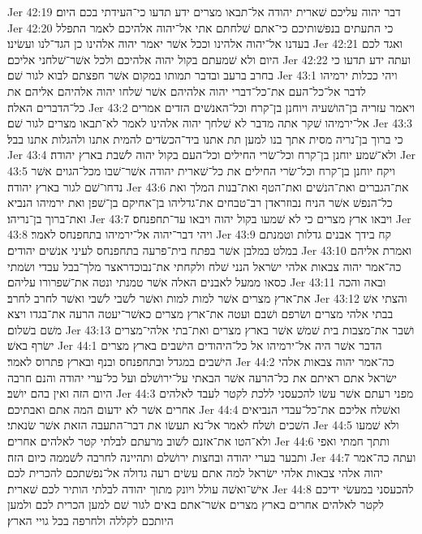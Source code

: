 Jer 42:19  דבר יהוה עליכם שׁארית יהודה אל־תבאו מצרים ידע תדעו כי־העידתי בכם היום׃
Jer 42:20  כי התעתים בנפשׁותיכם כי־אתם שׁלחתם אתי אל־יהוה אלהיכם לאמר התפלל בעדנו אל־יהוה אלהינו וככל אשׁר יאמר יהוה אלהינו כן הגד־לנו ועשׂינו׃
Jer 42:21  ואגד לכם היום ולא שׁמעתם בקול יהוה אלהיכם ולכל אשׁר־שׁלחני אליכם׃
Jer 42:22  ועתה ידע תדעו כי בחרב ברעב ובדבר תמותו במקום אשׁר חפצתם לבוא לגור שׁם׃
Jer 43:1  ויהי ככלות ירמיהו לדבר אל־כל־העם את־כל־דברי יהוה אלהיהם אשׁר שׁלחו יהוה אלהיהם אליהם את כל־הדברים האלה׃
Jer 43:2  ויאמר עזריה בן־הושׁעיה ויוחנן בן־קרח וכל־האנשׁים הזדים אמרים אל־ירמיהו שׁקר אתה מדבר לא שׁלחך יהוה אלהינו לאמר לא־תבאו מצרים לגור שׁם׃
Jer 43:3  כי ברוך בן־נריה מסית אתך בנו למען תת אתנו ביד־הכשׂדים להמית אתנו ולהגלות אתנו בבל׃
Jer 43:4  ולא־שׁמע יוחנן בן־קרח וכל־שׂרי החילים וכל־העם בקול יהוה לשׁבת בארץ יהודה׃
Jer 43:5  ויקח יוחנן בן־קרח וכל־שׂרי החילים את כל־שׁארית יהודה אשׁר־שׁבו מכל־הגוים אשׁר נדחו־שׁם לגור בארץ יהודה׃
Jer 43:6  את־הגברים ואת־הנשׁים ואת־הטף ואת־בנות המלך ואת כל־הנפשׁ אשׁר הניח נבוזראדן רב־טבחים את־גדליהו בן־אחיקם בן־שׁפן ואת ירמיהו הנביא ואת־ברוך בן־נריהו׃
Jer 43:7  ויבאו ארץ מצרים כי לא שׁמעו בקול יהוה ויבאו עד־תחפנחס׃
Jer 43:8  ויהי דבר־יהוה אל־ירמיהו בתחפנחס לאמר׃
Jer 43:9  קח בידך אבנים גדלות וטמנתם במלט במלבן אשׁר בפתח בית־פרעה בתחפנחס לעיני אנשׁים יהודים׃
Jer 43:10  ואמרת אליהם כה־אמר יהוה צבאות אלהי ישׂראל הנני שׁלח ולקחתי את־נבוכדראצר מלך־בבל עבדי ושׂמתי כסאו ממעל לאבנים האלה אשׁר טמנתי ונטה את־שׁפרורו עליהם׃
Jer 43:11  ובאה והכה את־ארץ מצרים אשׁר למות למות ואשׁר לשׁבי לשׁבי ואשׁר לחרב לחרב׃
Jer 43:12  והצתי אשׁ בבתי אלהי מצרים ושׂרפם ושׁבם ועטה את־ארץ מצרים כאשׁר־יעטה הרעה את־בגדו ויצא משׁם בשׁלום׃
Jer 43:13  ושׁבר את־מצבות בית שׁמשׁ אשׁר בארץ מצרים ואת־בתי אלהי־מצרים ישׂרף באשׁ׃
Jer 44:1  הדבר אשׁר היה אל־ירמיהו אל כל־היהודים הישׁבים בארץ מצרים הישׁבים במגדל ובתחפנחס ובנף ובארץ פתרוס לאמר׃
Jer 44:2  כה־אמר יהוה צבאות אלהי ישׂראל אתם ראיתם את כל־הרעה אשׁר הבאתי על־ירושׁלם ועל כל־ערי יהודה והנם חרבה היום הזה ואין בהם יושׁב׃
Jer 44:3  מפני רעתם אשׁר עשׂו להכעסני ללכת לקטר לעבד לאלהים אחרים אשׁר לא ידעום המה אתם ואבתיכם׃
Jer 44:4  ואשׁלח אליכם את־כל־עבדי הנביאים השׁכים ושׁלח לאמר אל־נא תעשׂו את דבר־התעבה הזאת אשׁר שׂנאתי׃
Jer 44:5  ולא שׁמעו ולא־הטו את־אזנם לשׁוב מרעתם לבלתי קטר לאלהים אחרים׃
Jer 44:6  ותתך חמתי ואפי ותבער בערי יהודה ובחצות ירושׁלם ותהיינה לחרבה לשׁממה כיום הזה׃
Jer 44:7  ועתה כה־אמר יהוה אלהי צבאות אלהי ישׂראל למה אתם עשׂים רעה גדולה אל־נפשׁתכם להכרית לכם אישׁ־ואשׁה עולל ויונק מתוך יהודה לבלתי הותיר לכם שׁארית׃
Jer 44:8  להכעסני במעשׂי ידיכם לקטר לאלהים אחרים בארץ מצרים אשׁר־אתם באים לגור שׁם למען הכרית לכם ולמען היותכם לקללה ולחרפה בכל גויי הארץ׃
